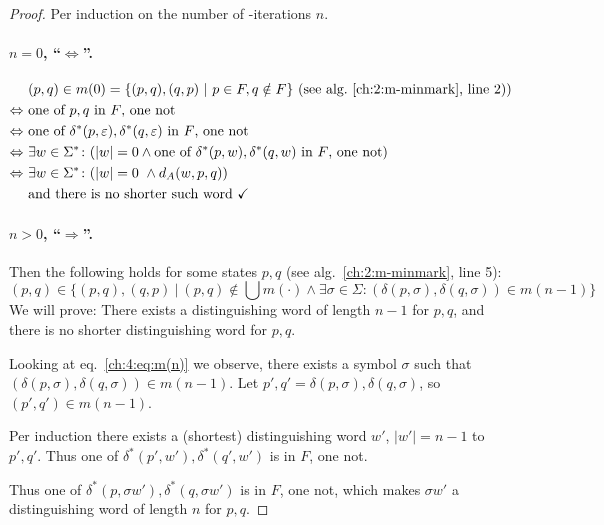 \begin{proof}
	Per induction on the number of \CompDist-iterations $n$.
	
	\paragraph*{$n = 0$, ``$\Leftrightarrow$''.}
	\begin{align*}
		&(p,q) \in m(0) = \{ (p,q), (q,p)\ |\ p \in F, q \notin F \}\hfill\text{ (see alg.~\ref{ch:2:m-minmark}, line 2))}\\
		\Leftrightarrow\ &\text{one of $p,q$ in $F$, one not}\\
		\Leftrightarrow\ &\text{one of $\delta^*(p, \varepsilon),\delta^*(q, \varepsilon)$ in $F$, one not}\\
		\Leftrightarrow\ &\exists w\in\Sigma^*\colon (|w|=0\land\text{one of $\delta^*(p, w),\delta^*(q, w)$ in $F$, one not})\\
		\Leftrightarrow\ &\exists w\in\Sigma^*\colon (|w| = 0\ \land d_A(w, p, q))\\
		&\text{and there is no shorter such word }\checkmark
	\end{align*}

\paragraph*{$n > 0$, ``$\Rightarrow$''.} 
Then the following holds for some states $p,q$ (see alg.~\ref{ch:2:m-minmark}, line 5):
\begin{equation}\label{ch:4:eq:m(n)}
(p,q) \in \{ (p,q), (q,p)\ |\ (p,q) \notin \bigcup{m(\cdot)} \land \exists \sigma \in \Sigma \colon (\delta(p,\sigma), \delta(q,\sigma)) \in m(n-1) \}
\end{equation}
We will prove: There exists a distinguishing word of length $n-1$ for $p,q$, and there is no shorter distinguishing word for $p,q$.

Looking at eq.~\ref{ch:4:eq:m(n)} we observe, there exists a symbol $\sigma$ such that $(\delta(p,\sigma),\delta(q,\sigma)) \in m(n-1)$. Let $p',q'=\delta(p,\sigma),\delta(q,\sigma)$, so $(p',q')\in m(n-1)$.

Per induction there exists a (shortest) distinguishing word $w'$, $|w'|=n-1$ to $p',q'$. Thus one of $\delta^*(p', w'),\delta^*(q', w')$ is in $F$, one not.

Thus one of $\delta^*(p, \sigma w'),\delta^*(q, \sigma w')$ is in $F$, one not, which makes $\sigma w'$ a distinguishing word of length $n$ for $p,q$.


\end{proof}
